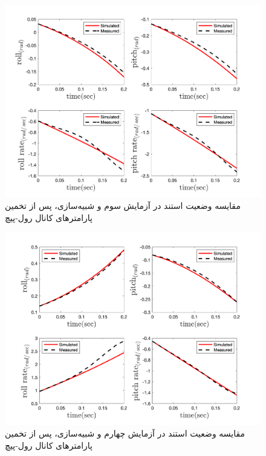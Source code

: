 \begin{figure}[H]
	\includegraphics[width=12cm]{../Figures/RCP/roll_pitch_parameter_estimation/RCP_roll_pitch_S3.png}
	\centering
	\caption{مقايسه وضعیت استند در  آزمايش سوم و شبیه‌سازی، پس از تخمین پارامترهای کانال رول-پیچ}
	\label{roll_pitch_ps3}
\end{figure}
\begin{figure}[H]
	\includegraphics[width=12cm]{../Figures/RCP/roll_pitch_parameter_estimation/RCP_roll_pitch_S4.png}
	\centering
	\caption{مقايسه وضعیت استند در  آزمايش چهارم و شبیه‌سازی، پس از تخمین پارامترهای کانال رول-پیچ}
	\label{roll_pitch_ps4}
\end{figure}
